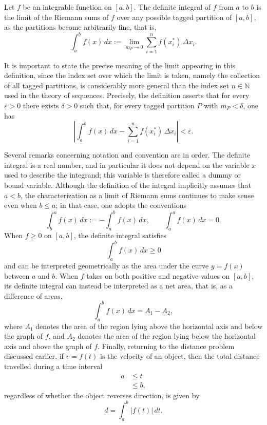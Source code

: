 \begin{definition}
Let $f$ be an integrable function on $[a,b]$. The definite integral of $f$ from $a$ to $b$ is the limit of the Riemann sums of $f$ over any possible tagged partition of $[a,b]$, as the partitions become arbitrarily fine, that is,
\[
\int_a^b f(x) \, dx := \lim_{m_P \to 0} \sum_{i=1}^{n} f(x_i^*) \, \Delta x_i.
\]

\end{definition}

It is important to state the precise meaning of the limit appearing in this definition, since the index set over which the limit is taken, namely the collection of all tagged partitions, is considerably more general than the index set $n \in \mathbb{N}$ used in the theory of sequences. Precisely, the definition asserts that for every $\varepsilon > 0$ there exists $\delta > 0$ such that, for every tagged partition $P$ with $m_P < \delta$, one has
\[
\left| \int_a^b f(x) \, dx - \sum_{i=1}^{n} f(x_i^*) \, \Delta x_i \right| < \varepsilon.
\]

Several remarks concerning notation and convention are in order. The definite integral is a real number, and in particular it does not depend on the variable $x$ used to describe the integrand; this variable is therefore called a dummy or bound variable. Although the definition of the integral implicitly assumes that $a < b$, the characterization as a limit of Riemann sums continues to make sense even when $b \leq a$; in that case, one adopts the conventions
\[
\int_b^a f(x) \, dx := -\int_a^b f(x) \, dx, \qquad \int_a^a f(x) \, dx = 0.
\]
When $f \geq 0$ on $[a,b]$, the definite integral satisfies \[
\int_a^b f(x) \, dx \geq 0
\] and can be interpreted geometrically as the area under the curve $y = f(x)$ between $a$ and $b$. When $f$ takes on both positive and negative values on $[a,b]$, its definite integral can instead be interpreted as a net area, that is, as a difference of areas, \[
\int_a^b f(x) \, dx = A_1 - A_2,
\] where $A_1$ denotes the area of the region lying above the horizontal axis and below the graph of $f$, and $A_2$ denotes the area of the region lying below the horizontal axis and above the graph of $f$. Finally, returning to the distance problem discussed earlier, if $v = f(t)$ is the velocity of an object, then the total distance travelled during a time interval
\[
\begin{aligned}
a &\leq t \\
&\leq b,
\end{aligned}
\]
regardless of whether the object reverses direction, is given by
\[
d = \int_a^b |f(t)| \, dt.
\]

